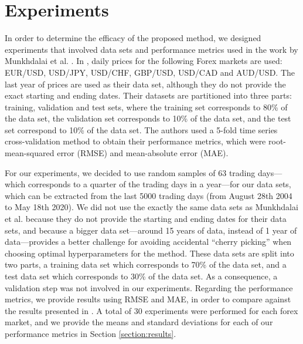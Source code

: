 \documentclass{ieeeaccess}
\begin{document}
\section{Experiments}
\label{section:experiments}

In order to determine the efficacy of the proposed method, we designed
experiments that involved data sets and performance metrics used in
the work by Munkhdalai et al. \cite{Munkhdalai2019}. In
\cite{Munkhdalai2019}, daily prices for the following Forex markets
are used: EUR/USD, USD/JPY, USD/CHF, GBP/USD, USD/CAD and AUD/USD. The last
year of prices are used as their data set, although they do not
provide the exact starting and ending dates. Their datasets are
partitioned into three parts: training, validation and test sets,
where the training set corresponds to 80\% of the data set, the
validation set corresponds to 10\% of the data set, and the test set
correspond to 10\% of the data set. The authors used a 5-fold time
series cross-validation method to obtain their performance metrics,
which were root-mean-squared error (RMSE) and mean-absolute error (MAE).

For our experiments, we decided to use random samples of 63 trading
days---which corresponds to a quarter of the trading days in a
year---for our data sets, which can be extracted from the last 5000
trading days (from August 28th 2004 to May 18th 2020). We did not use
the exactly the same data sets as Munkhdalai et al. because they do
not provide the starting and ending dates for their data sets, and
because a bigger data set---around 15 years of data, instead of 1 year
of data---provides a better challenge for avoiding accidental ``cherry
picking'' \cite{morse2010cherry} when choosing optimal hyperparameters
for the method. %
These data sets
are split into two parts, a training data set which corresponds to
70\% of the data set, and a test data set which corresponds to 30\% of
the data set. As a consequence, a validation step was not involved in
our experiments. Regarding the performance metrics, we provide results
using RMSE and MAE, in order to compare against the results presented
in \cite{Munkhdalai2019}. A total
of 30 experiments were performed for each forex market, and we provide
the means and standard deviations for each of our performance metrics
in Section \ref{section:results}.
\end{document}
